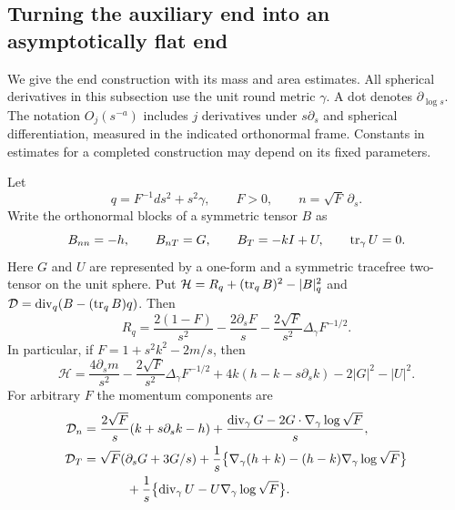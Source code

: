 \subsection{Turning the auxiliary end into an asymptotically flat end}
\label{str-bc-section}

We give the end construction with its mass and area estimates. All spherical
derivatives in this subsection use the unit round metric $\gamma$. A dot denotes
$\partial_{\log s}$. The notation $O_j(s^{-a})$ includes $j$ derivatives under
$s\partial_s$ and spherical differentiation, measured in the indicated
orthonormal frame. Constants in estimates for a completed construction may
depend on its fixed parameters.

\begin{lemma}
\label{str-bc-constraints}
\label{lem:str-bend-constraints}
Let
\[
 q=F^{-1}ds^2+s^2\gamma,\qquad F>0,\qquad n=\sqrt F\,\partial_s.
\]
Write the orthonormal blocks of a symmetric tensor $B$ as
\[
 B_{nn}=-h,\qquad B_{nT}=G,\qquad B_T=-kI+U,
 \qquad \operatorname{tr}_\gamma U=0.
\]
Here $G$ and $U$ are represented by a one-form and a symmetric tracefree
two-tensor on the unit sphere. Put
$\mathcal H=R_q+(\operatorname{tr}_qB)^2-|B|_q^2$ and
$\mathcal D=\operatorname{div}_q(B-(\operatorname{tr}_qB)q)$. Then
\begin{equation}
 R_q=\frac{2(1-F)}{s^2}-\frac{2\partial_sF}{s}
       -\frac{2\sqrt F}{s^2}\Delta_\gamma F^{-1/2}.
 \label{str-bc-scalar}
\end{equation}
In particular, if $F=1+s^2k^2-2m/s$, then
\begin{equation}
 \mathcal H=\frac{4\partial_sm}{s^2}
 -\frac{2\sqrt F}{s^2}\Delta_\gamma F^{-1/2}
 +4k(h-k-s\partial_sk)-2|G|^2-|U|^2.
 \label{str-bc-hamiltonian}
\end{equation}
For arbitrary $F$ the momentum components are
\begin{align}
 \mathcal D_n&=\frac{2\sqrt F}{s}(k+s\partial_sk-h)
 +\frac{\divg_\gamma G-2G\cdot\nabla_\gamma\log\sqrt F}{s},
 \label{str-bc-momentum-normal}\\
 \mathcal D_T&=\sqrt F(\partial_sG+3G/s)
 +\frac{1}{s}\bigl\{\nabla_\gamma(h+k)
 -(h-k)\nabla_\gamma\log\sqrt F\bigr\}\nonumber\\
 &\hspace{12mm}+\frac{1}{s}\bigl\{\divg_\gamma U
                    -U\nabla_\gamma\log\sqrt F\bigr\}.
 \label{str-bc-momentum-tangent}
\end{align}
\end{lemma}

